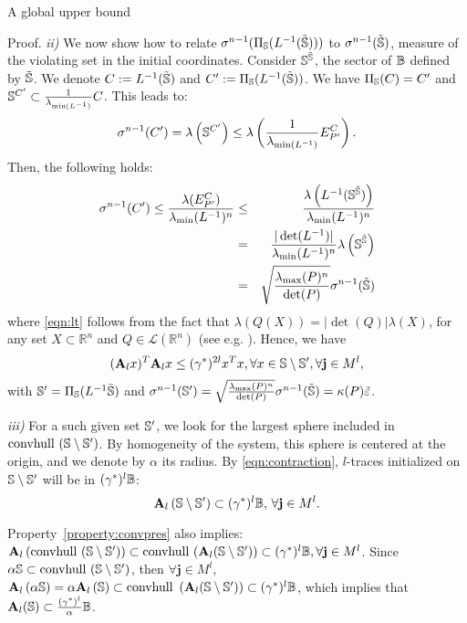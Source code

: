 \begin{subsection}{A global upper bound}
\begin{pf*}{Proof.}
\textit{ii)} We now show how to relate $\sigma^{n-1}(\Pi_{\mathbb{S}}(L^{-1}(\tilde{\mathbb{S}})))$ to $\sigma^{n-1}(\tilde{\mathbb{S}})$, measure of the violating set in the initial coordinates. Consider $\mathbb{S}^{\tilde{\mathbb{S}}}$, the sector of $\mathbb{B}$ defined by $\tilde{\mathbb{S}}$. We denote $C:= L^{-1}(\tilde{\mathbb{S}})$ and $C':=\Pi_{\mathbb{S}}(L^{-1}(\tilde{\mathbb{S}}))$. We have $\Pi_{\mathbb{S}}(C) = C'$ and $\mathbb{S}^{C'} \subset \frac{1}{ \lambda_{\min (L^{-1})}} C$. This leads to:
$$\sigma^{n-1}(C') = \lambda \left( \mathbb{S}^{C'} \right) \leq \lambda \left( \frac{1}{ \lambda_{\min (L^{-1})}} E_{P'}^{C} \right).$$ Then, the following holds: 
\begin{eqnarray}
\nonumber\sigma^{n-1}(C') \leq \frac{\lambda(E_{P'}^{C})}{\lambda_{\min}(L^{-1})^n} &\leq& \frac{\lambda \left( L^{-1}(\mathbb{S}^{\tilde{\mathbb{S}}}) \right)}{\lambda_{\min}(L^{-1})^n} \\
\label{eqn:lt} &=&\frac{|\det(L^{-1})|}{\lambda_{\min}(L^{-1})^n}\lambda \left( \mathbb{S}^{\tilde{\mathbb{S}}} \right) \\
\label{eqn:map1} &=&\sqrt{\frac{\lambda_{\max}(P)^n}{\det(P)}}\sigma^{n-1}(\tilde{\mathbb{S}})
\end{eqnarray}
where \eqref{eqn:lt} follows from the fact that $\lambda(Q(X)) = |\det(Q)| \lambda(X)$, for any set $X \subset \mathbb{R}^n$ and $Q \in \mathcal{L}(\mathbb{R}^n)$ (see e.g. \cite{rudin}). Hence, we have
\begin{equation}\label{eqn:contraction}
(\relax{\mathbf{A}}_l x)^T \relax{\mathbf{A}}_l x \leq (\gamma^{*})^{2l} x^Tx, \forall x \in \mathbb{S} \setminus \mathbb{S}', \forall \mathbf{j} \in M^l,
\end{equation}
with $\mathbb{S}' = \Pi_{\mathbb{S}}(L^{-1}\tilde{\mathbb{S}})$ and $\sigma^{n-1}(\mathbb{S}') = \sqrt{\frac{\lambda_{\max}(P)^n}{\det(P)}}\sigma^{n-1}(\tilde{\mathbb{S}})= \kappa(P) \tilde{\varepsilon}$.


\textit{iii)} For a such given set $\mathbb{S}'$, we look for the largest sphere included in $\mbox{convhull } (\mathbb{S} \setminus \mathbb{S}')$. By homogeneity of the system, this sphere is centered at the origin, and we denote by $\alpha$ its radius. By \eqref{eqn:contraction}, $l$-traces initialized on $\mathbb{S} \setminus \mathbb{S}'$ will be in $(\gamma^*)^l \mathbb{B}$: $$\relax{\mathbf{A}}_l \left( \mathbb{S} \setminus \mathbb{S}' \right) \subset (\gamma^*)^l \mathbb{B}, \, \forall \mathbf{j} \in M^l.$$
 
Property~\ref{property:convpres} also implies: 
$\relax{\mathbf{A}}_l \left( \mbox{convhull }(\mathbb{S} \setminus \mathbb{S}') \right) \subset \mbox{convhull }( \relax{\mathbf{A}}_l (\mathbb{S} \setminus \mathbb{S}')) \subset (\gamma^*)^l \mathbb{B}, \forall \mathbf{j} \in M^l$. Since $\alpha \mathbb{S} \subset \mbox{convhull } (\mathbb{S} \setminus \mathbb{S}')$, then $\forall \mathbf{j} \in M^l$, $\relax{\mathbf{A}}_l \left( \alpha \mathbb{S} \right) = \alpha \relax{\mathbf{A}}_l \left( \mathbb{S} \right) \subset \mbox{convhull } \left( \relax{\mathbf{A}}_l (\mathbb{S} \setminus \mathbb{S}') \right) \subset (\gamma^*)^l \mathbb{B}$, which implies that $ \relax{\mathbf{A}}_l (\mathbb{S}) \subset \frac{(\gamma^*)^l}{\alpha} \mathbb{B}$.


\end{pf*}
\end{subsection}
